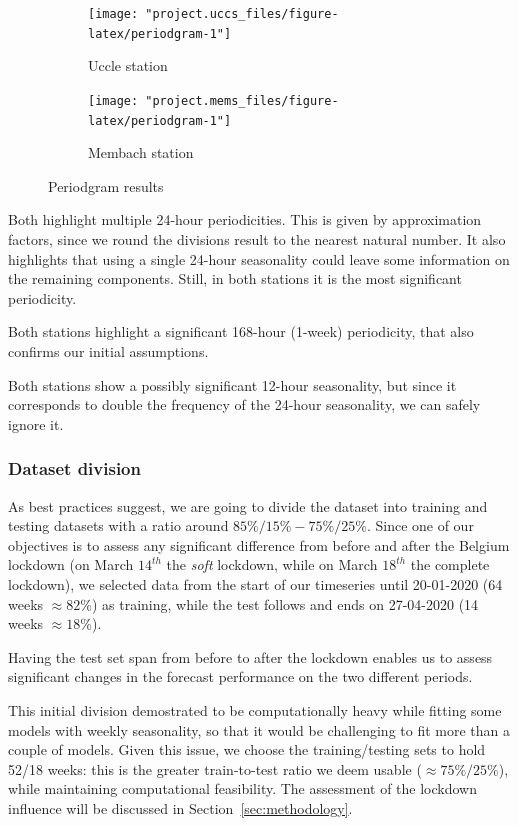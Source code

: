 \documentclass[12pt]{article}
\begin{document}
\begin{figure}[h]
	\begin{subfigure}{.5\linewidth}
		\texttt{[image: "project.uccs\_files/figure-latex/periodgram-1"]}
		\caption{Uccle station}
		\label{fig:periodgram:uccs}
	\end{subfigure}
	\begin{subfigure}{.5\linewidth}
		\texttt{[image: "project.mems\_files/figure-latex/periodgram-1"]}
		\caption{Membach station}
		\label{fig:periodgram:mems}
	\end{subfigure}
	\caption{Periodgram results}
	\label{fig:periodgram}
\end{figure}
%
Both highlight multiple 24-hour periodicities. This is given by approximation factors, since we round the divisions result to the nearest natural number. It also highlights that using a single 24-hour seasonality could leave some information on the remaining components. Still, in both stations it is the most significant periodicity.

Both stations highlight a significant 168-hour (1-week) periodicity, that also confirms our initial assumptions.

Both stations show a possibly significant 12-hour seasonality, but since it corresponds to double the frequency of the 24-hour seasonality, we can safely ignore it.

\subsubsection{Dataset division}
As best practices suggest, we are going to divide the dataset into training and testing datasets with a ratio around $85\%/15\% - 75\%/25\%$.
Since one of our objectives is to assess any significant difference from before and after the Belgium lockdown (on March $14^{th}$ the \textit{soft} lockdown, while on March $18^{th}$ the complete lockdown), we selected data from the start of our timeseries until 20-01-2020 (64 weeks $\approx 82\%$) as training, while the test follows and ends on 27-04-2020 (14 weeks $\approx 18\%$).

Having the test set span from before to after the lockdown enables us to assess significant changes in the forecast performance on the two different periods.

This initial division demostrated to be computationally heavy while fitting some models with weekly seasonality, so that it would be challenging to fit more than a couple of models.
Given this issue, we choose the training/testing sets to hold 52/18 weeks: this is the greater train-to-test ratio we deem usable ($\approx 75\%/25\%$), while maintaining computational feasibility.
The assessment of the lockdown influence will be discussed in Section~\ref{sec:methodology}.
\end{document}
